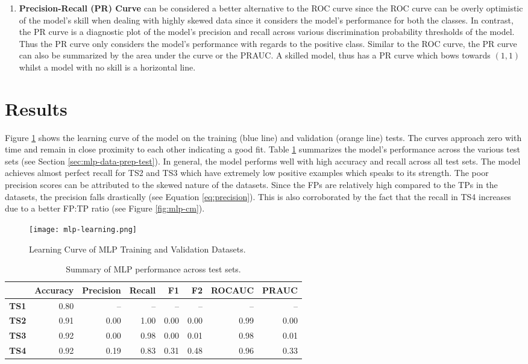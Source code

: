 \begin{enumerate}
\item \textbf{Precision-Recall (PR) Curve} can be considered a better
  alternative to the ROC curve since the ROC curve can be overly
  optimistic of the model's skill when dealing with highly skewed data
  since it considers the model's performance for both the classes. In
  contrast, the PR curve is a diagnostic plot of the model's precision
  and recall across various discrimination probability thresholds of
  the model. Thus the PR curve only considers the model's performance
  with regards to the positive class. Similar to the ROC curve, the PR
  curve can also be summarized by the area under the curve or the
  PRAUC. A skilled model, thus has a PR curve which bows towards
  $(1,1)$ whilst a model with no skill is a horizontal line.
\end{enumerate}

\section{Results}
\label{sec:mlp-disc}

Figure \ref{fig:mlp-learning} shows the learning curve of the model on
the training (blue line) and validation (orange line) tests. The
curves approach zero with time and remain in close proximity to each
other indicating a good fit. Table \ref{tab:mlp-results} summarizes
the model's performance across the various test sets (see Section
\ref{sec:mlp-data-prep-test}). In general, the model performs well
with high accuracy and recall across all test sets. The model achieves
almost perfect recall for TS2 and TS3 which have extremely low
positive examples which speaks to its strength. The poor precision
scores can be attributed to the skewed nature of the datasets. Since
the FPs are relatively high compared to the TPs in the datasets, the
precision falls drastically (see Equation \ref{eq:precision}). This is
also corroborated by the fact that the recall in TS4 increases due to
a better FP:TP ratio (see Figure \ref{fig:mlp-cm}).

\begin{figure}[htb]
  \centering
  \texttt{[image: mlp-learning.png]}
  \caption{Learning Curve of MLP Training and Validation Datasets.}
  \label{fig:mlp-learning}
\end{figure}

\begin{table}[htb]
  \centering
  \caption{Summary of MLP performance across test sets.}
    \begin{tabular}{rrrrrrrr}
      \hline
      & Accuracy & Precision & Recall & F1 & F2 & ROCAUC & PRAUC \\
      \hline
      \textbf{TS1} & 0.80 & -- & -- & -- & -- & -- & -- \\
      \textbf{TS2} & 0.91 & 0.00 & 1.00 & 0.00 & 0.00 & 0.99 & 0.00 \\
      \textbf{TS3} & 0.92 & 0.00 & 0.98 & 0.00 & 0.01 & 0.98 & 0.01 \\
      \textbf{TS4} & 0.92 & 0.19 & 0.83 & 0.31 & 0.48 & 0.96 & 0.33 \\
      \hline
    \end{tabular}
    \label{tab:mlp-results}
\end{table}

